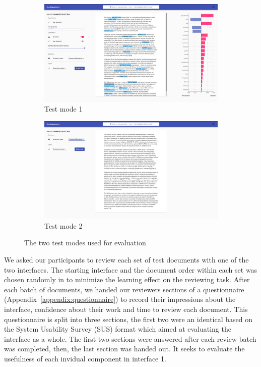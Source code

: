 \documentclass[\version]{l4proj}
\begin{document}
\begin{figure}[H]
    \centering
    \begin{subfigure}[c]{0.49\textwidth}
        \centering
        \includegraphics[width=\textwidth]{images/ui_test_mode_1.png}
        \caption{Test mode 1}\label{fig:test-mode-1}
    \end{subfigure}
    \begin{subfigure}[c]{0.49\textwidth}
        \centering
        \includegraphics[width=\textwidth]{images/ui_test_mode_2.png}
        \caption{Test mode 2}\label{fig:test-mode-2}
    \end{subfigure}
    \caption{The two test modes used for evaluation}\label{fig:test-modes}
    \vspace{-15pt}
\end{figure}

We asked our participants to review each set of test documents with one of the two interfaces.
The starting interface and the document order within each set was chosen randomly in to minimize the learning effect on the reviewing task.
After each batch of documents, we handed our reviewers sections of a questionnaire (Appendix~\ref{appendix:questionnaire}) to record their impressions about the interface, confidence about their work and time to review each document.
This questionnaire is split into three sections, the first two were an identical based on the System Usability Survey (SUS) format \autocite[Chap.~21]{jordanUsabilityEvaluationIndustry1996} which aimed at evaluating the interface as a whole.
The first two sections were answered after each review batch was completed, then, the last section was handed out.
It seeks to evaluate the usefulness of each invidual component in interface 1.
\end{document}
